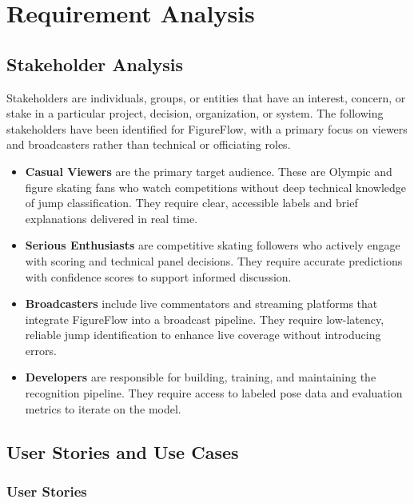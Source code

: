 \chapter{Requirement Analysis}
\label{chap:requirement-analysis}

\section{Stakeholder Analysis}
\label{section:stakeholder-analysis}

Stakeholders are individuals, groups, or entities that have an interest,
concern, or stake in a particular project, decision, organization, or
system. The following stakeholders have been identified for FigureFlow,
with a primary focus on viewers and broadcasters rather than technical
or officiating roles.

\begin{itemize}
    \item \textbf{Casual Viewers} are the primary target audience.
    These are Olympic and figure skating fans who watch competitions
    without deep technical knowledge of jump classification. They
    require clear, accessible labels and brief explanations delivered
    in real time.

    \item \textbf{Serious Enthusiasts} are competitive skating followers
    who actively engage with scoring and technical panel decisions.
    They require accurate predictions with confidence scores to support
    informed discussion.

    \item \textbf{Broadcasters} include live commentators and streaming
    platforms that integrate FigureFlow into a broadcast pipeline.
    They require low-latency, reliable jump identification to enhance
    live coverage without introducing errors.

    \item \textbf{Developers} are responsible for building, training,
    and maintaining the recognition pipeline. They require access to
    labeled pose data and evaluation metrics to iterate on the model.
\end{itemize}


\section{User Stories and Use Cases}
\label{section:user-stories-use-cases}

\subsection{User Stories}

